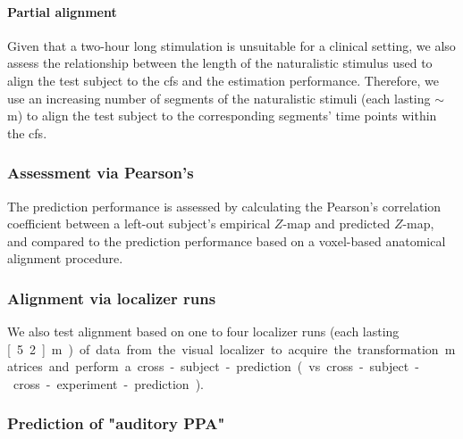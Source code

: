 \paragraph{Partial alignment}
%
Given that a two-hour long stimulation is unsuitable for a clinical setting, we
also assess the relationship between the length of the naturalistic stimulus
used to align the test subject to the \ac{cfs} and the estimation performance.
%
Therefore, we use an increasing number of segments of the naturalistic stimuli
(each lasting $\sim$\unit[15]{m}) to align the test subject to the corresponding
segments' time points within the \ac{cfs}.


\subsubsection{Assessment via Pearson's}

%
The prediction performance is assessed by calculating the Pearson's correlation
coefficient between a left-out subject's empirical $Z$-map and predicted
$Z$-map, and compared to the prediction performance based on a voxel-based
anatomical alignment procedure.


\subsubsection{Alignment via localizer runs}


%
We also test alignment based on one to four localizer runs (each lasting
\unit[5.2]{m}) of data from the visual localizer to acquire the transformation
matrices and perform a cross-subject-prediction (vs.
cross-subject-cross-experiment-prediction).


\subsubsection{Prediction of "auditory PPA"}



